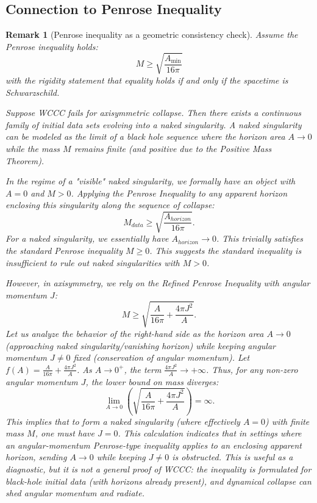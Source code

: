 \documentclass[12pt,a4paper]{article}
\newtheorem{remark}[theorem]{Remark}
\begin{document}
\subsection{Connection to Penrose Inequality}
\begin{remark}[Penrose inequality as a geometric consistency check]
Assume the Penrose inequality holds:
\begin{equation}
M \geq \sqrt{\frac{A_{\min}}{16\pi}}
\end{equation}
with the rigidity statement that equality holds if and only if the spacetime is Schwarzschild.

Suppose WCCC fails for axisymmetric collapse. Then there exists a continuous family of initial data sets evolving into a naked singularity. A naked singularity can be modeled as the limit of a black hole sequence where the horizon area $A \to 0$ while the mass $M$ remains finite (and positive due to the Positive Mass Theorem).

In the regime of a "visible" naked singularity, we formally have an object with $A=0$ and $M > 0$.
Applying the Penrose Inequality to any apparent horizon enclosing this singularity along the sequence of collapse:
\begin{equation}
M_{data} \geq \sqrt{\frac{A_{horizon}}{16\pi}}.
\end{equation}
For a naked singularity, we essentially have $A_{horizon} \to 0$. This trivially satisfies the standard Penrose inequality $M \geq 0$. This suggests the standard inequality is insufficient to rule out naked singularities with $M>0$.

However, in axisymmetry, we rely on the \textit{Refined} Penrose Inequality with angular momentum $J$:
\begin{equation}
M \geq \sqrt{\frac{A}{16\pi} + \frac{4\pi J^2}{A}}.
\end{equation}
Let us analyze the behavior of the right-hand side as the horizon area $A \to 0$ (approaching naked singularity/vanishing horizon) while keeping angular momentum $J \neq 0$ fixed (conservation of angular momentum).
Let $f(A) = \frac{A}{16\pi} + \frac{4\pi J^2}{A}$.
As $A \to 0^+$, the term $\frac{4\pi J^2}{A} \to +\infty$.
Thus, for any non-zero angular momentum $J$, the lower bound on mass diverges:
\begin{equation}
\lim_{A \to 0} \left( \sqrt{\frac{A}{16\pi} + \frac{4\pi J^2}{A}} \right) = \infty.
\end{equation}
This implies that to form a naked singularity (where effectively $A=0$) with finite mass $M$, one must have $J=0$. 
This calculation indicates that in settings where an angular-momentum Penrose-type inequality applies to an enclosing apparent horizon, sending $A\to 0$ while keeping $J\neq 0$ is obstructed. This is useful as a diagnostic, but it is not a general proof of WCCC: the inequality is formulated for black-hole initial data (with horizons already present), and dynamical collapse can shed angular momentum and radiate.
\end{remark}
\end{document}
